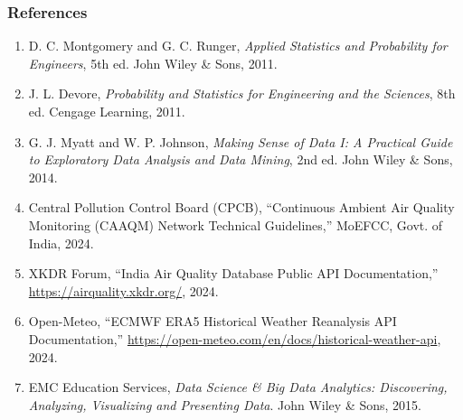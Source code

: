 \documentclass[twoside]{article}
\begin{document}
\subsubsection*{References}
\begin{enumerate}
  \setlength{\itemsep}{1pt}
  \footnotesize
  \item D. C. Montgomery and G. C. Runger, \emph{Applied Statistics and Probability for Engineers}, 5th ed. John Wiley \& Sons, 2011.
  \item J. L. Devore, \emph{Probability and Statistics for Engineering and the Sciences}, 8th ed. Cengage Learning, 2011.
  \item G. J. Myatt and W. P. Johnson, \emph{Making Sense of Data I: A Practical Guide to Exploratory Data Analysis and Data Mining}, 2nd ed. John Wiley \& Sons, 2014.
  \item Central Pollution Control Board (CPCB), ``Continuous Ambient Air Quality Monitoring (CAAQM) Network Technical Guidelines,'' MoEFCC, Govt. of India, 2024.
  \item XKDR Forum, ``India Air Quality Database Public API Documentation,'' \url{https://airquality.xkdr.org/}, 2024.
  \item Open-Meteo, ``ECMWF ERA5 Historical Weather Reanalysis API Documentation,'' \url{https://open-meteo.com/en/docs/historical-weather-api}, 2024.
  \item EMC Education Services, \emph{Data Science \& Big Data Analytics: Discovering, Analyzing, Visualizing and Presenting Data}. John Wiley \& Sons, 2015.
\end{enumerate}
\end{document}
